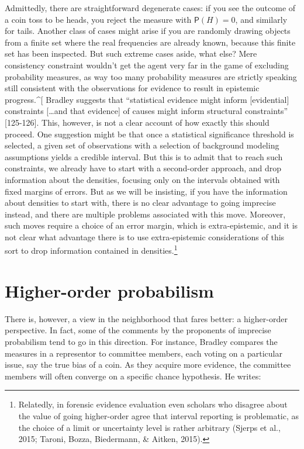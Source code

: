 \documentclass[
  10pt,
  dvipsnames,enabledeprecatedfontcommands]{scrartcl}
\begin{document}
Admittedly, there are straightforward degenerate cases: if you see the
outcome of a coin toss to be heads, you reject the measure with
\(\mathsf{P}(H)=0\), and similarly for tails. Another class of cases
might arise if you are randomly drawing objects from a finite set where
the real frequencies are already known, because this finite set has been
inspected. But such extreme cases aside, what else? Mere consistency
constraint wouldn't get the agent very far in the game of excluding
probability measures, as way too many probability measures are strictly
speaking still consistent with the observations for evidence to result
in epistemic progress.\^{}{[} Bradley suggests that ``statistical
evidence might inform {[}evidential{]} constraints {[}\dots and that
evidence{]} of causes might inform structural constraints''
{[}125-126{]}. This, however, is not a clear account of how exactly this
should proceed. One suggestion might be that once a statistical
significance threshold is selected, a given set of observations with a
selection of background modeling assumptions yields a credible interval.
But this is to admit that to reach such constraints, we already have to
start with a second-order approach, and drop information about the
densities, focusing only on the intervals obtained with fixed margins of
errors. But as we will be insisting, if you have the information about
densities to start with, there is no clear advantage to going imprecise
instead, and there are multiple problems associated with this move.
Moreover, such moves require a choice of an error margin, which is
extra-epistemic, and it is not clear what advantage there is to use
extra-epistemic considerations of this sort to drop information
contained in densities.\footnote{Relatedly, in forensic evidence
  evaluation even scholars who disagree about the value of going
  higher-order agree that interval reporting is problematic, as the
  choice of a limit or uncertainty level is rather arbitrary (Sjerps et
  al., 2015; Taroni, Bozza, Biedermann, \& Aitken, 2015).}

\hypertarget{higher-order-probabilism}{%
\section{Higher-order probabilism}\label{higher-order-probabilism}}

There is, however, a view in the neighborhood that fares better: a
higher-order perspective. In fact, some of the comments by the
proponents of imprecise probabilism tend to go in this direction. For
instance, Bradley compares the measures in a representor to committee
members, each voting on a particular issue, say the true bias of a coin.
As they acquire more evidence, the committee members will often converge
on a specific chance hypothesis. He writes:
\end{document}
